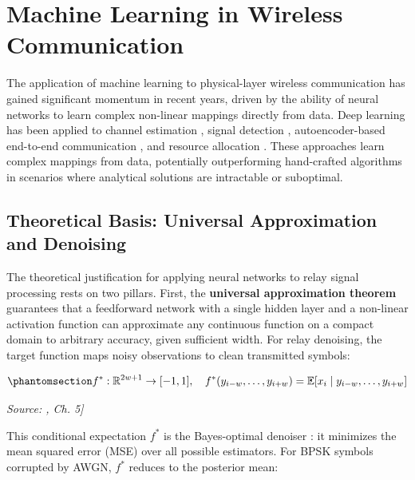 \section{Machine Learning in Wireless Communication}\label{sec:machine-learning-in-wireless-communication}

The application of machine learning to physical-layer wireless communication has gained significant momentum in recent years, driven by the ability of neural networks to learn complex non-linear mappings directly from data. Deep learning has been applied to channel estimation \cite{YeLiJuang2018OFDMDL}, signal detection \cite{SamuelDiskinWunder2019MIMODetect}, autoencoder-based end-to-end communication \cite{Dorner2018OverTheAirDL}, and resource allocation \cite{Sun2018LearnToOptimize}. These approaches learn complex mappings from data, potentially outperforming hand-crafted algorithms in scenarios where analytical solutions are intractable or suboptimal.

\subsection{Theoretical Basis: Universal Approximation and Denoising}\label{sec:theoretical-basis-universal-approximation-and-denoising}

The theoretical justification for applying neural networks to relay signal processing rests on two pillars. First, the \textbf{universal approximation theorem} \cite{GoodfellowBengioCourville2016DeepLearning} guarantees that a feedforward network with a single hidden layer and a non-linear activation function can approximate any continuous function on a compact domain to arbitrary accuracy, given sufficient width. For relay denoising, the target function maps noisy observations to clean transmitted symbols:

\begin{equation}\protect\phantomsection\label{eq:optimal-denoiser}{f^*: \mathbb{R}^{2w+1} \to [-1, 1], \quad f^*(y_{i-w}, \dots, y_{i+w}) = \mathbb{E}[x_i \mid y_{i-w}, \dots, y_{i+w}]
}\end{equation} \par{\small\textit{Source: \cite{GoodfellowBengioCourville2016DeepLearning}, Ch. 5]}}

This conditional expectation \(f^*\) is the Bayes-optimal denoiser : it minimizes the mean squared error (MSE) over all possible estimators. For BPSK symbols corrupted by AWGN, \(f^*\) reduces to the posterior mean:

